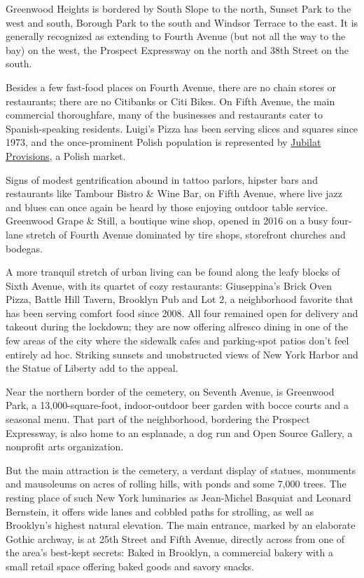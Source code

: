 Greenwood Heights is bordered by South Slope to the north, Sunset Park
to the west and south, Borough Park to the south and Windsor Terrace to
the east. It is generally recognized as extending to Fourth Avenue (but
not all the way to the bay) on the west, the Prospect Expressway on the
north and 38th Street on the south.

Besides a few fast-food places on Fourth Avenue, there are no chain
stores or restaurants; there are no Citibanks or Citi Bikes. On Fifth
Avenue, the main commercial thoroughfare, many of the businesses and
restaurants cater to Spanish-speaking residents. Luigi's Pizza has been
serving slices and squares since 1973, and the once-prominent Polish
population is represented by
\href{https://www.nytimes3xbfgragh.onion/2013/01/13/nyregion/jubilat-provisions-a-polish-market-with-a-roll-call-of-kielbasa.html}{Jubilat
Provisions}, a Polish market.

Signs of modest gentrification abound in tattoo parlors, hipster bars
and restaurants like Tambour Bistro \& Wine Bar, on Fifth Avenue, where
live jazz and blues can once again be heard by those enjoying outdoor
table service. Greenwood Grape \& Still, a boutique wine shop, opened in
2016 on a busy four-lane stretch of Fourth Avenue dominated by tire
shops, storefront churches and bodegas.

A more tranquil stretch of urban living can be found along the leafy
blocks of Sixth Avenue, with its quartet of cozy restaurants:
Giuseppina's Brick Oven Pizza, Battle Hill Tavern, Brooklyn Pub and Lot
2, a neighborhood favorite that has been serving comfort food since
2008. All four remained open for delivery and takeout during the
lockdown; they are now offering alfresco dining in one of the few areas
of the city where the sidewalk cafes and parking-spot patios don't feel
entirely ad hoc. Striking sunsets and unobstructed views of New York
Harbor and the Statue of Liberty add to the appeal.

Near the northern border of the cemetery, on Seventh Avenue, is
Greenwood Park, a 13,000-square-foot, indoor-outdoor beer garden with
bocce courts and a seasonal menu. That part of the neighborhood,
bordering the Prospect Expressway, is also home to an esplanade, a dog
run and Open Source Gallery, a nonprofit arts organization.

But the main attraction is the cemetery, a verdant display of statues,
monuments and mausoleums on acres of rolling hills, with ponds and some
7,000 trees. The resting place of such New York luminaries as
Jean-Michel Basquiat and Leonard Bernstein, it offers wide lanes and
cobbled paths for strolling, as well as Brooklyn's highest natural
elevation. The main entrance, marked by an elaborate Gothic archway, is
at 25th Street and Fifth Avenue, directly across from one of the area's
best-kept secrets: Baked in Brooklyn, a commercial bakery with a small
retail space offering baked goods and savory snacks.


